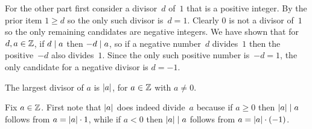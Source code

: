 \documentclass{ibl}  %
\begin{document}
\begin{problem}
\begin{exes}
\begin{answer}
  For the other part 
  first consider a divisor~$d$ of~$1$ that is a positive integer.
  By the prior item $1\geq d$ so the only such divisor is~$d=1$.
  Clearly $0$ is not a divisor of~$1$ so the only remaining candidates
  are negative integers.
  We have shown that for $d,a\in\mathbb{Z}$, if $d\mid a$ then $-d\mid a$,
  so if a negative number~$d$ divides~$1$ then the positive~$-d$ 
  also divides~$1$.
  Since the only such positive number is~$-d=1$, the only 
  candidate for a negative divisor is $d=-1$. 
\end{answer}
\begin{exercise}
  The largest divisor of $a$ is $\lvert a\rvert$, for $a\in\mathbb{Z}$ with $a\neq 0$.
\end{exercise}
\begin{answer}
  Fix $a\in\mathbb{Z}$. 
  First note that $\lvert a\rvert$ does indeed divide~$a$ because
  if $a\geq 0$ then $\lvert a\rvert\mid a$ follows from 
  $a=\lvert a\rvert\cdot 1$,
  while if $a<0$ then $\lvert a\rvert\mid a$ follows from 
  $a=\lvert a\rvert\cdot(-1)$.


\end{answer}
\end{exes}
\end{problem}
\end{document}
